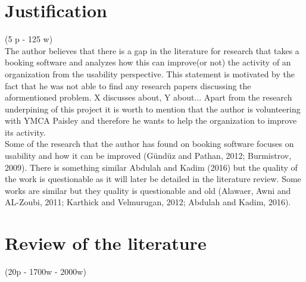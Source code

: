 \documentclass[version=last,fontsize=13pt]{scrartcl}
\begin{document}
\section{Justification}(5 p - 125 w)\\
	\indent
	The author believes that there is a gap in the literature for  research that takes a booking software and analyzes how this can improve(or not) the activity of an organization from the usability perspective. This statement is motivated by the fact that he was not able to find any research papers discussing the aformentioned problem. X discusses about, Y about... Apart from the research underpining of this project it is worth to mention that the author is volunteering with YMCA Paisley and therefore he wants to help the organization to improve its activity.\\

	Some of the research that the author has found on booking software focuses on usability and how it can be improved (Gündüz and  Pathan, 2012; Burmistrov, 2009). There is something similar  Abdulah and Kadim (2016) but the quality of the work is questionable as it will later be detailed in the literature review. Some works are similar but they  quality is questionable and old (Alawaer, Awni and AL-Zoubi, 2011; Karthick and Velmurugan, 2012; Abdulah and Kadim, 2016).

\pagebreak

\section{Review of the literature } (20p - 1700w - 2000w)\\

\end{document}
